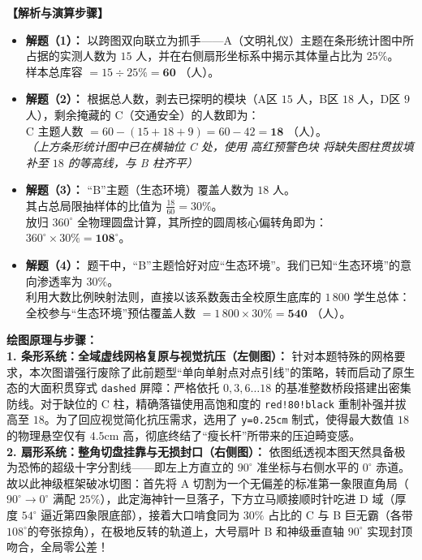 \vspace{0.4cm}
\textbf{【解析与演算步骤】}
\begin{itemize}
    \item \textbf{解题（1）：} 以跨图双向联立为抓手——A（文明礼仪）主题在条形统计图中所占据的实测人数为 $15$ 人，并在右侧扇形坐标系中揭示其体量占比为 $25\%$。\\
    样本总库容 $= 15 \div 25\% = \mathbf{60}$ （人）。
    \item \textbf{解题（2）：} 根据总人数，剥去已探明的模块（A区 $15$ 人，B区 $18$ 人，D区 $9$ 人），剩余掩藏的 C（交通安全）的人数即为：\\
    C 主题人数 $= 60 - (15 + 18 + 9) = 60 - 42 = \mathbf{18}$ （人）。\\
    \textit{（上方条形统计图中已在横轴位 C 处，使用 \textcolor{red!80!black}{高红预警色块} 将缺失图柱贯拔填补至 $18$ 的等高线，与 B 柱齐平）}
    \item \textbf{解题（3）：} “B”主题（生态环境）覆盖人数为 $18$ 人。\\
    其占总局限抽样体的比值为 $\frac{18}{60} = 30\%$。\\
    放归 $360^\circ$ 全物理圆盘计算，其所控的圆周核心偏转角即为：$360^\circ \times 30\% = \mathbf{108^\circ}$。
    \item \textbf{解题（4）：} 题干中，“B”主题恰好对应“生态环境”。我们已知“生态环境”的意向渗透率为 $30\%$。\\
    利用大数比例映射法则，直接以该系数轰击全校原生底库的 $1\,800$ 学生总体：\\
    全校参与“生态环境”预估覆盖人数 $= 1\,800 \times 30\% = \mathbf{540}$ （人）。
\end{itemize}

\vspace{0.4cm}
{\small\color{blue!70!black}
\textbf{绘图原理与步骤：}\\
\textbf{1. 条形系统：全域虚线网格复原与视觉抗压（左侧图）：} 针对本题特殊的网格要求，本次图谱强行废除了此前题型“单向单射点对点引线”的策略，转而启动了原生态的大面积贯穿式 \texttt{dashed} 屏障：严格依托 $0, 3, 6 \dots 18$ 的基准整数桥段搭建出密集防线。对于缺位的 C 柱，精确落锚使用高饱和度的 \texttt{red!80!black} 重制补强并拔高至 $18$。为了回应视觉简化抗压需求，选用了 \texttt{y=0.25cm} 制式，使得最大数值 $18$ 的物理悬空仅有 $4.5\mathrm{cm}$ 高，彻底终结了“瘦长杆”所带来的压迫畸变感。\\
\textbf{2. 扇形系统：整角切盘挂靠与无损封口（右侧图）：} 依图纸透视本图天然具备极为恐怖的超级十字分割线——即左上方直立的 $90^\circ$ 准坐标与右侧水平的 $0^\circ$ 赤道。故以此神级框架破冰切图：首先将 A 切割为一个无偏差的标准第一象限直角局（$90^\circ \to 0^\circ$ 满配 $25\%$），此定海神针一旦落子，下方立马顺接顺时针吃进 D 域（厚度 $54^\circ$ 逼近第四象限底部），接着大口啃食同为 $30\%$ 占比的 C 与 B 巨无霸（各带 $108^\circ$的夸张掠角），在极地反转的轨道上，大号扇叶 B 和神级垂直轴 $90^\circ$ 实现封顶吻合，全局零公差！
}

